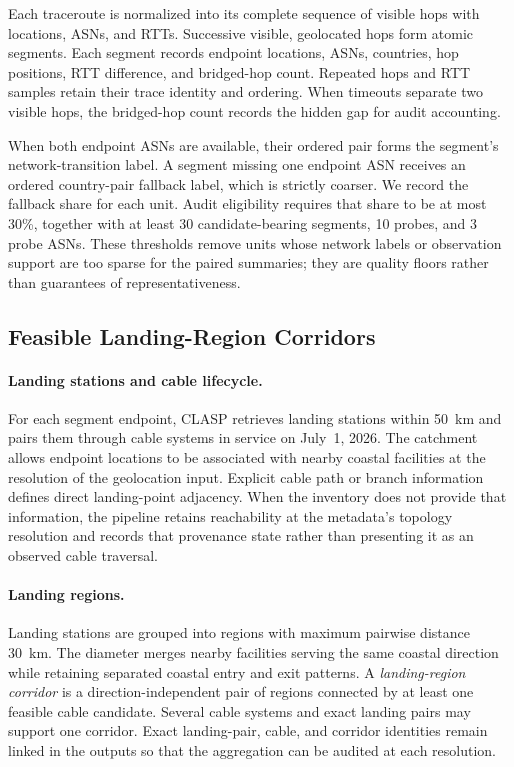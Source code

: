 Each traceroute is normalized into its complete sequence of visible hops with
locations, ASNs, and RTTs. Successive visible, geolocated hops form atomic
segments. Each segment records endpoint locations, ASNs, countries, hop
positions, RTT difference, and bridged-hop count. Repeated hops and RTT samples
retain their trace identity and ordering. When timeouts separate two visible
hops, the bridged-hop count records the hidden gap for audit accounting.

When both endpoint ASNs are available, their ordered pair forms the segment's
network-transition label. A segment missing one endpoint ASN receives an
ordered country-pair fallback label, which is strictly coarser. We record the
fallback share for each unit. Audit eligibility requires that share to be at
most 30\%, together with at least 30 candidate-bearing segments, 10 probes,
and 3 probe ASNs. These thresholds remove units whose network labels or
observation support are too sparse for the paired summaries; they are quality
floors rather than guarantees of representativeness.

\subsection{Feasible Landing-Region Corridors}
\label{sec:framework_projection}

\paragraph{Landing stations and cable lifecycle.}
For each segment endpoint, CLASP retrieves landing stations within 50~km and
pairs them through cable systems in service on July~1, 2026. The catchment
allows endpoint locations to be associated with nearby coastal facilities at
the resolution of the geolocation input. Explicit cable path or branch
information defines direct landing-point adjacency. When the inventory does
not provide that information, the pipeline retains reachability at the
metadata's topology resolution and records that provenance state rather than
presenting it as an observed cable traversal.

\paragraph{Landing regions.}
Landing stations are grouped into regions with maximum pairwise distance
30~km. The diameter merges nearby facilities serving the same coastal
direction while retaining separated coastal entry and exit patterns. A
\emph{landing-region corridor} is a direction-independent pair of regions
connected by at least one feasible cable candidate. Several cable systems and
exact landing pairs may support one corridor. Exact landing-pair, cable, and
corridor identities remain linked in the outputs so that the aggregation can
be audited at each resolution.

